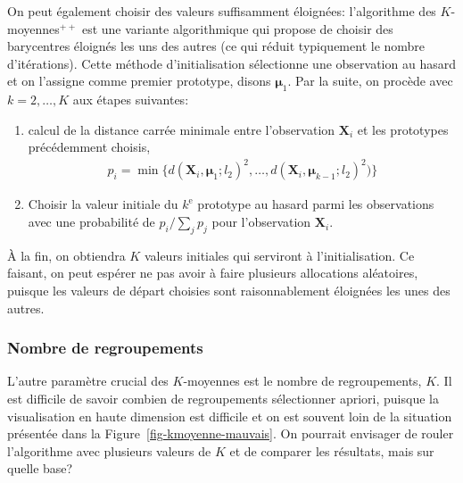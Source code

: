\documentclass[
  11pt,
  letterpaper,
]{scrbook}
\providecommand{\tightlist}{%
  \setlength{\itemsep}{0pt}\setlength{\parskip}{0pt}}\usepackage{longtable,booktabs,array}
\theoremstyle{definition}
\theoremstyle{remark}
\begin{document}
On peut également choisir des valeurs suffisamment éloignées:
l'algorithme des \(K\)-moyennes\({}^{++}\) est une variante
algorithmique qui propose de choisir des barycentres éloignés les uns
des autres (ce qui réduit typiquement le nombre d'itérations). Cette
méthode d'initialisation sélectionne une observation au hasard et on
l'assigne comme premier prototype, disons \(\boldsymbol{\mu}_1\). Par la
suite, on procède avec \(k=2, \ldots, K\) aux étapes suivantes:

\begin{enumerate}
\def\labelenumi{\arabic{enumi}.}
\tightlist
\item
  calcul de la distance carrée minimale entre l'observation
  \(\mathbf{X}_i\) et les prototypes précédemment choisis,
  \begin{align*}
  p_i = \min \{d(\mathbf{X}_i, \boldsymbol{\mu}_1; l_2)^2, \ldots, d(\mathbf{X}_i, \boldsymbol{\mu}_{k-1}; l_2)^2)\}
  \end{align*}
\item
  Choisir la valeur initiale du \(k^{\text{e}}\) prototype au hasard
  parmi les observations avec une probabilité de \(p_i/\sum_{j} p_j\)
  pour l'observation \(\mathbf{X}_i\).
\end{enumerate}

À la fin, on obtiendra \(K\) valeurs initiales qui serviront à
l'initialisation. Ce faisant, on peut espérer ne pas avoir à faire
plusieurs allocations aléatoires, puisque les valeurs de départ choisies
sont raisonnablement éloignées les unes des autres.

\hypertarget{nombre-de-regroupements}{%
\subsubsection*{Nombre de regroupements}\label{nombre-de-regroupements}}

L'autre paramètre crucial des \(K\)-moyennes est le nombre de
regroupements, \(K\). Il est difficile de savoir combien de
regroupements sélectionner apriori, puisque la visualisation en haute
dimension est difficile et on est souvent loin de la situation présentée
dans la Figure~\ref{fig-kmoyenne-mauvais}. On pourrait envisager de
rouler l'algorithme avec plusieurs valeurs de \(K\) et de comparer les
résultats, mais sur quelle base?
\end{document}
